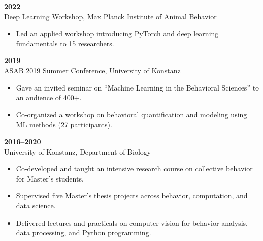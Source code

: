 \documentclass[10pt,letterpaper]{article}
\begin{document}
	\vspace{4pt}
	\textbf{2022}\\
	Deep Learning Workshop, Max Planck Institute of Animal Behavior
	\begin{itemize}
		\item Led an applied workshop introducing PyTorch and deep learning fundamentals to 15 researchers.
	\end{itemize}
	
	\vspace{4pt}
	\textbf{2019}\\
	ASAB 2019 Summer Conference, University of Konstanz
	\begin{itemize}
		\item Gave an invited seminar on “Machine Learning in the Behavioral Sciences” to an audience of 400+.
		\item Co-organized a workshop on behavioral quantification and modeling using ML methods (27 participants).
	\end{itemize}
	
	\vspace{4pt}
	\textbf{2016--2020}\\
	University of Konstanz, Department of Biology
	\begin{itemize}
		\item Co-developed and taught an intensive research course on collective behavior for Master’s students.
		\item Supervised five Master’s thesis projects across behavior, computation, and data science.
		\item Delivered lectures and practicals on computer vision for behavior analysis, data processing, and Python programming.
	\end{itemize}
	
	
	
	
	
	
\end{document}
